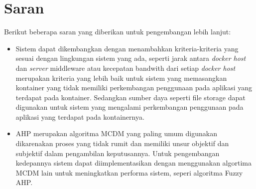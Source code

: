   \section{Saran}
  Berikut beberapa saran yang diberikan untuk pengembangan lebih lanjut:
  \begin{itemize}
    \item Sistem dapat dikembangkan dengan menambahkan kriteria-kriteria yang sesuai dengan lingkungan sistem yang ada, seperti jarak antara \textit{docker host} dan \textit{server} middleware atau kecepatan bandwith dari setiap \textit{docker host} merupakan kriteria yang lebih baik untuk sistem yang memasangkan kontainer yang tidak memiliki perkembangan penggunaan pada aplikasi yang terdapat pada kontainer. Sedangkan sumber daya seperti file storage dapat digunakan untuk sistem yang mengalami perkembangan penggunaan pada aplikasi yang terdapat pada kontainernya.
    \item AHP merupakan algoritma MCDM yang paling umum digunakan dikarenakan proses yang tidak rumit dan memiliki unsur objektif dan subjektif dalam pengambilan keputusannya. Untuk pengembangan kedepannya sistem dapat diimplementasikan dengan menggunakan algortima MCDM lain untuk meningkatkan performa sistem, seperi algoritma Fuzzy AHP.
  \end{itemize}


